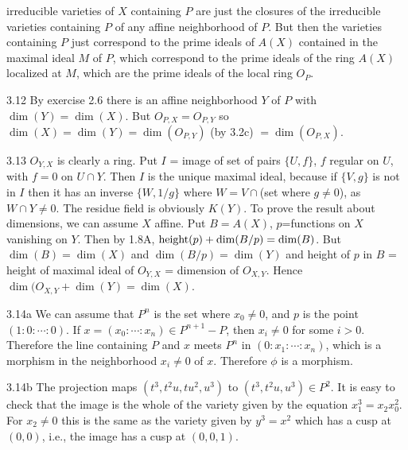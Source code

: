 irreducible varieties of $X$ containing $P$ are just the closures
of the irreducible varieties containing $P$ of any affine neighborhood
of $P$. But then the varieties containing $P$ 
just correspond to the prime ideals of $A(X)$ contained in the maximal 
ideal $M$ of $P$, which correspond to the prime ideals 
of the ring $A(X)$ localized at $M$, which are 
the prime ideals of the local ring $O_P$. 
\item{3.12} By exercise 2.6 there is an affine neighborhood $Y$ of $P$
with $\dim(Y)=\dim(X)$. But $O_{P,X}=O_{P,Y}$ so
$\dim(X)=\dim(Y)=\dim(O_{P,Y})$ (by 3.2c) $=\dim(O_{P,X})$. 
\item{3.13} $O_{Y,X}$ is clearly a ring. Put $I$ = image of set of pairs
$\lbrace U,f \rbrace$, $f$ regular on $U$, with $f=0$ on $U\cap Y$.
Then $I$ is the unique maximal ideal, because if $\lbrace V,g\rbrace$
is not in $I$ then it has an inverse $\lbrace W,1/g\rbrace$ where 
$W=V\cap$(set where $g\ne 0$), as $W\cap Y\ne 0$. 
The residue field is obviously $K(Y)$. 
To prove the result about dimensions, we can assume $X$ affine. Put $B=A(X)$,
$p$=functions on $X$ vanishing on $Y$. Then by 1.8A, $\hbox{height}(p)
+\dim(B/p)=\dim(B)$. But $\dim(B)=\dim(X)$ and $\dim(B/p)=\dim(Y)$ 
and height of $p$ in $B$ = height of maximal ideal of $O_{Y,X}$
= dimension of $O_{X,Y}$. Hence $\dim(O_{X,Y}+\dim(Y)=\dim(X)$. 
\item{3.14a} We can assume that $P^n$ is the set where $x_0\ne 0$,
and $p$ is the point $(1:0:\cdots:0)$. If $x=(x_0:\cdots :x_n)\in P^{n+1}-P$,
then $x_i\ne 0 $ for some $i>0$. Therefore the line containing $P$ and $x$ 
meets $P^n$ in $(0:x_1:\cdots:x_n)$, which is a morphism in the neighborhood
$x_i\ne 0$ of $x$. Therefore $\phi$ is a morphism. 
\item{3.14b} The projection maps $(t^3,t^2u, tu^2, u^3)$ to 
$(t^3,t^2u, u^3)\in P^2$. It is easy to check that the image
is the whole of the variety given by the equation $x_1^3=x_2x_0^2$.
For $x_2\ne 0$ this is the same as the variety given 
by $y^3=x^2$ which has a cusp at $(0,0)$, i.e., the image has
a cusp at $(0,0,1)$.

\bye
